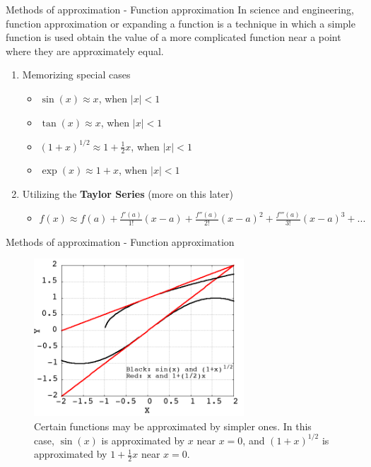 \documentclass{beamer}
\begin{document}
\begin{frame}{Methods of approximation - Function approximation}
In science and engineering, \alert{function approximation} or \alert{expanding a function} is a technique in which a simple function is used obtain the value of a more complicated function near a point where they are approximately equal. 
\begin{enumerate}
\item Memorizing \alert{special cases}
\begin{itemize}
\item $\sin(x) \approx x$, when $|x| < 1$
\item $\tan(x) \approx x$, when $|x| < 1$
\item $(1+x)^{1/2} \approx 1+ \frac{1}{2}x$, when $|x| < 1$
\item $\exp(x) \approx 1 + x$, when $|x| < 1$
\end{itemize}
\item Utilizing the \textbf{Taylor Series} (more on this later)
\begin{itemize}
\item $f(x) \approx f(a) + \frac{f'(a)}{1!}(x-a) + \frac{f''(a)}{2!}(x-a)^2 + \frac{f'''(a)}{3!}(x-a)^3 + ...$
\end{itemize}
\end{enumerate}
\end{frame}

\begin{frame}{Methods of approximation - Function approximation}
\begin{figure}
\centering
\includegraphics[width=0.7\textwidth]{figures/taylor_series.png}
\caption{\label{fig:approx} Certain functions may be approximated by simpler ones.  In this case, $\sin(x)$ is approximated by $x$ near $x=0$, and $(1+x)^{1/2}$ is approximated by $1+\frac{1}{2}x$ near $x=0$.}
\end{figure}
\end{frame}
\end{document}
